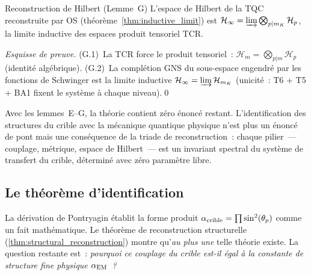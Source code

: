 \documentclass[12pt,a4paper]{article}
\begin{document}
\begin{thmbox}{Reconstruction de Hilbert (Lemme~G)}\mTHM
\label{thm:hilbert_reconstruction}
L'espace de Hilbert de la TQC reconstruite par OS
(théorème~\ref{thm:inductive_limit}) est
$\mathcal{H}_\infty = \varinjlim \bigotimes_{p | m_K} \mathcal{H}_p$,
la limite inductive des espaces produit tensoriel TCR.
\end{thmbox}

\noindent\textit{Esquisse de preuve.}
(G.1)~La TCR force le produit tensoriel~:
$\mathcal{H}_m = \bigotimes_{p|m} \mathcal{H}_p$ (identité
algébrique).
(G.2)~La complétion GNS du sous-espace engendré par les fonctions
de Schwinger est la limite inductive
$\mathcal{H}_\infty = \varinjlim \mathcal{H}_{m_K}$ (unicité~:
T6 + T5 + BA1 fixent le système à chaque niveau).\qed

\medskip
Avec les lemmes~E--G, la théorie contient zéro énoncé \BRIDGETAG{}
restant. L'identification des structures du crible avec la mécanique
quantique physique n'est plus un énoncé de pont mais une conséquence
de la triade de reconstruction~: chaque pilier~--- couplage,
métrique, espace de Hilbert~--- est un invariant spectral du système
de transfert du crible, déterminé avec zéro paramètre libre.

\subsection{Le théorème d'identification}
\label{sec:ch9_wightman}

La dérivation de Pontryagin établit la forme produit
$\alpha_{\rm crible} = \prod \sin^2(\theta_{p})$ comme un fait mathématique.
Le théorème de reconstruction structurelle
(\ref{thm:structural_reconstruction}) montre qu'\emph{au plus une}
telle théorie existe. La question restante est~: \emph{pourquoi
ce couplage du crible est-il égal à la constante de structure fine
physique $\alpha_{\mathrm{EM}}$~?}
\end{document}
